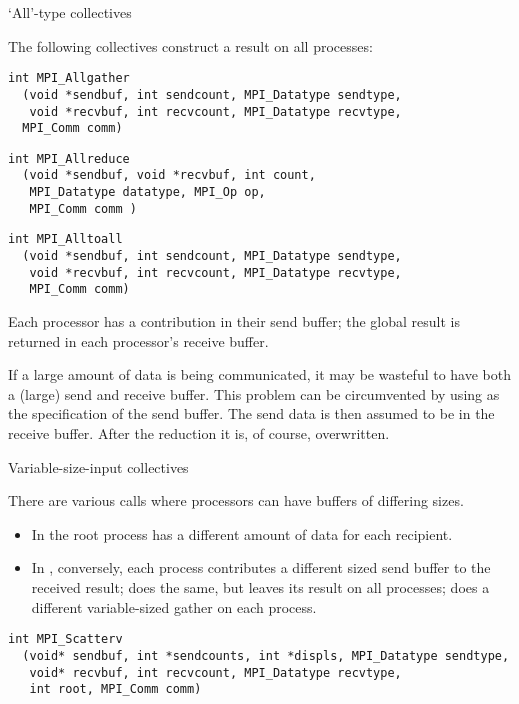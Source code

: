  {`All'-type collectives}

The following collectives construct a result on all processes:
\begin{verbatim}
int MPI_Allgather
  (void *sendbuf, int sendcount, MPI_Datatype sendtype, 
   void *recvbuf, int recvcount, MPI_Datatype recvtype, 
  MPI_Comm comm)
\end{verbatim}
%
\begin{verbatim}
int MPI_Allreduce 
  (void *sendbuf, void *recvbuf, int count, 
   MPI_Datatype datatype, MPI_Op op, 
   MPI_Comm comm )
\end{verbatim}
%
\begin{verbatim}
int MPI_Alltoall
  (void *sendbuf, int sendcount, MPI_Datatype sendtype, 
   void *recvbuf, int recvcount, MPI_Datatype recvtype, 
   MPI_Comm comm)
\end{verbatim}
Each processor has a contribution in their send buffer; the global result
is returned in each processor's receive buffer.

If a large amount of data is being communicated, it may be wasteful to 
have both a (large) send and receive buffer.
This problem can be circumvented by using 
as the specification of the send buffer. The send data is then
assumed to be in the receive buffer. After the reduction it is, of course,
overwritten.

 {Variable-size-input collectives}

There are various calls where processors can have
buffers of differing sizes.
\begin{itemize}
\item In  the root process has a different
  amount of data for each recipient.
\item In , conversely, each process
  contributes a different sized send buffer to the received result;
   does the same, but leaves its result
  on all processes;  does a different
  variable-sized gather on each process.
\end{itemize}

\begin{verbatim}
int MPI_Scatterv
  (void* sendbuf, int *sendcounts, int *displs, MPI_Datatype sendtype, 
   void* recvbuf, int recvcount, MPI_Datatype recvtype, 
   int root, MPI_Comm comm)
\end{verbatim}

